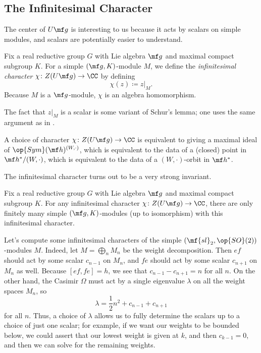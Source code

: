 \documentclass[../notes.tex]{subfiles}
\begin{document}
\subsection{The Infinitesimal Character}
The center of $U\mf g$ is interesting to us because it acts by scalars on simple modules, and scalars are potentially easier to understand.
\begin{definition}
	Fix a real reductive group $G$ with Lie algebra $\mf g$ and maximal compact subgroup $K$. For a simple $(\mf g,K)$-module $M$, we define the \textit{infinitesimal character} $\chi\colon Z(U\mf g)\to\CC$ by defining
	\[\chi(z)\coloneqq z|_M.\]
	Because $M$ is a $\mf g$-module, $\chi$ is an algebra homomorphism.
\end{definition}
\begin{remark}
	The fact that $z|_M$ is a scalar is some variant of Schur's lemma; one uses the same argument as in .
\end{remark}
\begin{remark}
	A choice of character $\chi\colon Z(U\mf g)\to\CC$ is equivalent to giving a maximal ideal of $\op{Sym}(\mf h)^{(W,\cdot)}$, which is equivalent to the data of a (closed) point in $\mf h^*/(W,\cdot)$, which is equivalent to the data of a $(W,\cdot)$-orbit in $\mf h^*$.
\end{remark}
The infinitesimal character turns out to be a very strong invariant.
\begin{proposition}
	Fix a real reductive group $G$ with Lie algebra $\mf g$ and maximal compact subgroup $K$. For any infinitesimal character $\chi\colon Z(U\mf g)\to\CC$, there are only finitely many simple $(\mf g,K)$-modules (up to isomorphism) with this infinitesimal character.
\end{proposition}
\begin{example}
	Let's compute some infinitesimal characters of the simple $(\mf{sl}_2,\op{SO}(2))$-modules $M$. Indeed, let $M=\bigoplus_nM_n$ be the weight decomposition. Then $ef$ should act by some scalar $c_{n-1}$ on $M_n$, and $fe$ should act by some scalar $c_{n+1}$ on $M_n$ as well. Because $[ef,fe]=h$, we see that $c_{n-1}-c_{n+1}=n$ for all $n$. On the other hand, the Casimir $\Omega$ must act by a single eigenvalue $\lambda$ on all the weight spaces $M_n$, so
	\[\lambda=\frac12n^2+c_{n-1}+c_{n+1}\]
	for all $n$. Thus, a choice of $\lambda$ allows us to fully determine the scalars up to a choice of just one scalar; for example, if we want our weights to be bounded below, we could assert that our lowest weight is given at $k$, and then $c_{k-1}=0$, and then we can solve for the remaining weights.
\end{example}
\end{document}
